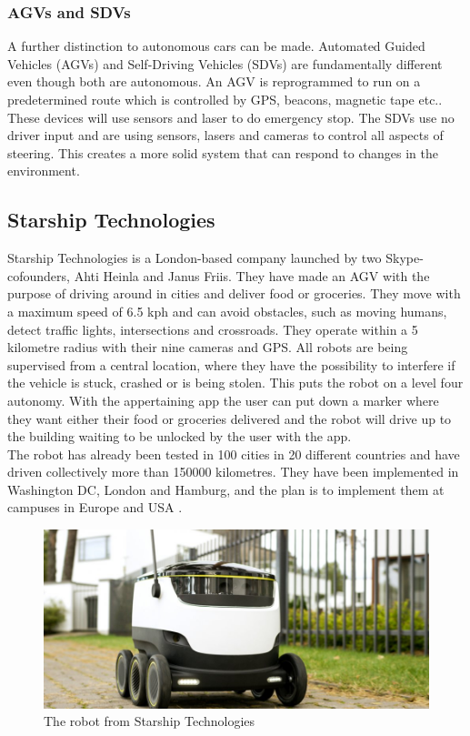 \subsubsection{AGVs and SDVs}
A further distinction to autonomous cars can be made. Automated Guided Vehicles (AGVs) and Self-Driving Vehicles (SDVs) are fundamentally different even though both are autonomous. An AGV is reprogrammed to run on a predetermined route which is controlled by GPS, beacons, magnetic tape etc.. These devices will use sensors and laser to do emergency stop. The SDVs use no driver input and are using sensors, lasers and cameras to control all aspects of steering. This creates a more solid system that can respond to changes in the environment. \cite{otto_motors}



\subsection{Starship Technologies}
Starship Technologies is a London-based company launched by two Skype-cofounders, Ahti Heinla and Janus Friis. They have made an AGV with the purpose of driving around in cities and deliver food or groceries. They move with a maximum speed of 6.5 kph and can avoid obstacles, such as moving humans, detect traffic lights, intersections and crossroads. They operate within a 5 kilometre radius with their nine cameras and GPS. All robots are being supervised from a central location, where they have the possibility to interfere if the vehicle is stuck, crashed or is being stolen. This puts the robot on a level four autonomy. With the appertaining app the user can put down a marker where they want either their food or groceries delivered and the robot will drive up to the building waiting to be unlocked by the user with the app.\\
The robot has already been tested in 100 cities in 20 different countries and have driven collectively more than 150000 kilometres. They have been implemented in Washington DC, London and Hamburg, and the plan is to implement them at campuses in Europe and USA \cite{Starship}\cite{Starship2}.
\begin{figure}[H]
 \centering
  \includegraphics[width=\textwidth]{Figures/ConAnalysis/Market/Starship_robot.jpg}
  \caption{The robot from Starship Technologies\cite{StarshipPic}}
  \label{fig:Starship}
\end{figure}

